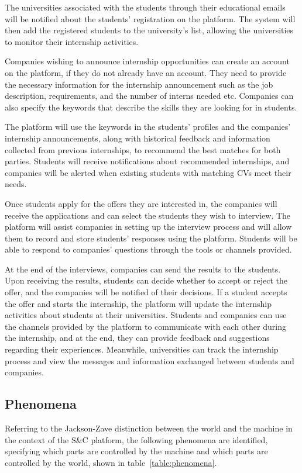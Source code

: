 The universities associated with the students through their educational emails will be notified about the students' registration on the platform. 
The system will then add the registered students to the university’s list, allowing the universities to monitor their internship activities.

Companies wishing to announce internship opportunities can create an account on the platform, if they do not already have an account. They need to
provide the necessary information for the internship announcement such as the job description, requirements, and the number of interns needed etc. 
Companies can also specify the keywords that describe the skills they are looking for in students.

The platform will use the keywords in the students' profiles and the companies' internship announcements, along with historical feedback and 
information collected from previous internships, to recommend the best matches for both parties. Students will receive notifications about 
recommended internships, and companies will be alerted when existing students with matching CVs meet their needs.

Once students apply for the offers they are interested in, the companies will receive the applications and can select the students they wish 
to interview. The platform will assist companies in setting up the interview process and will allow them to record and store students' responses 
using the platform. Students will be able to respond to companies' questions through the tools or channels provided.

At the end of the interviews, companies can send the results to the students. Upon receiving the results, students can decide whether to accept 
or reject the offer, and the companies will be notified of their decisions. If a student accepts the offer and starts the internship, the platform 
will update the internship activities about students at their universities. Students and companies can use the channels provided by the platform to
communicate with each other during the internship, and at the end, they can provide feedback and suggestions regarding their experiences. Meanwhile,
universities can track the internship process and view the messages and information exchanged between students and companies.

\subsection{Phenomena}
Referring to the Jackson-Zave distinction between the world and the machine in the context of the S\&C platform, the following phenomena are 
identified, specifying which parts are controlled by the machine and which parts are controlled by the world, shown in table~\ref{table:phenomena}.

